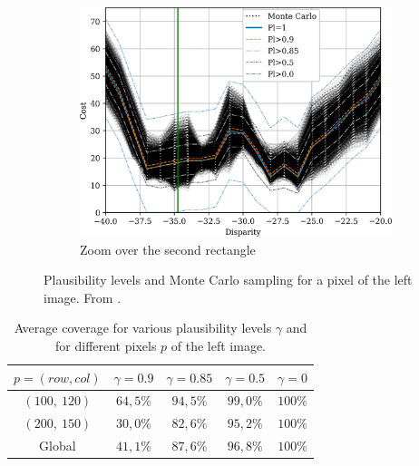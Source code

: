 \begin{figure}
\begin{subfigure}{0.45\linewidth}
        \includegraphics[width=\linewidth]{Images/Chap_4/cost_curve_200_150_zoom2.png}
        \caption{Zoom over the second rectangle}
        \label{fig:montecarlo_gauss_200_150_zoom2}
    \end{subfigure}
    \caption{Plausibility levels and Monte Carlo sampling for a pixel of the left image.  From \cite{malinowski_uncertainty_2024}.}
    \label{fig:montecarlo_gauss_200_150}
\end{figure}

\begin{table}[ht]
\centering
\begin{tabular}{|c|c|c|c|c|}
\hline
\rowcolor[HTML]{C0C0C0}
$p=(row,col)$ & $\gamma=0.9$  & $\gamma=0.85$ & $\gamma=0.5$  & $\gamma=0$   \\ \hline
\cellcolor[HTML]{C0C0C0}$(100,~120)$     & $64,5\%$ & $94,5\%$ & $99,0\%$ & $100\%$ \\ \hline
\cellcolor[HTML]{C0C0C0}$(200,~150)$     & $30,0\%$ & $82,6\%$ & $95,2\%$ & $100\%$ \\ \hline
\cellcolor[HTML]{C0C0C0}Global        & $41,1\%$ & $87,6\%$ & $96,8\%$ & $100\%$ \\ \hline
\end{tabular}
\caption{Average coverage for various plausibility levels $\gamma$ and for different pixels $p$ of the left image.}\label{tab:Coverage}
\end{table}

